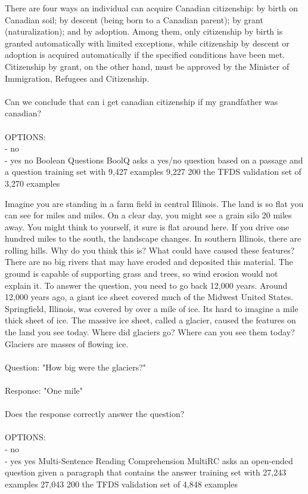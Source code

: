 \taskio
{There are four ways an individual can acquire Canadian citizenship: by birth on Canadian soil; by descent (being born to a Canadian parent); by grant (naturalization); and by adoption. Among them, only citizenship by birth is granted automatically with limited exceptions, while citizenship by descent or adoption is acquired automatically if the specified conditions have been met. Citizenship by grant, on the other hand, must be approved by the Minister of Immigration, Refugees and Citizenship.\\\\Can we conclude that can i get canadian citizenship if my grandfather was canadian?\\\\OPTIONS:\\- no\\- yes}
{no}
{
    \taskdescription
    {Boolean Questions} %
    {BoolQ} %
    {\cite{clark-etal-2019-boolq}} %
    {asks a yes/no question based on a passage and a question} %
    {training set with 9,427 examples} %
    {9,227} %
    {200} %
    {the TFDS validation set of 3,270 examples} %
}



\taskio
{Imagine you are standing in a farm field in central Illinois. The land is so flat you can see for miles and miles. On a clear day, you might see a grain silo 20 miles away. You might think to yourself, it sure is flat around here. If you drive one hundred miles to the south, the landscape changes. In southern Illinois, there are rolling hills. Why do you think this is? What could have caused these features? There are no big rivers that may have eroded and deposited this material. The ground is capable of supporting grass and trees, so wind erosion would not explain it. To answer the question, you need to go back 12,000 years. Around 12,000 years ago, a giant ice sheet covered much of the Midwest United States. Springfield, Illinois, was covered by over a mile of ice. Its hard to imagine a mile thick sheet of ice. The massive ice sheet, called a glacier, caused the features on the land you see today. Where did glaciers go? Where can you see them today? Glaciers are masses of flowing ice. \\\\Question: "How big were the glaciers?"\\\\Response: "One mile"\\\\Does the response correctly answer the question?\\\\OPTIONS:\\- no\\- yes}
{yes}
{
    \taskdescription
    {Multi-Sentence Reading Comprehension} %
    {MultiRC} %
    {\cite{khashabi-etal-2018-looking}} %
    {asks an open-ended question given a paragraph that contains the answer} %
    {training set with 27,243 examples} %
    {27,043} %
    {200} %
    {the TFDS validation set of 4,848 examples} %
}

